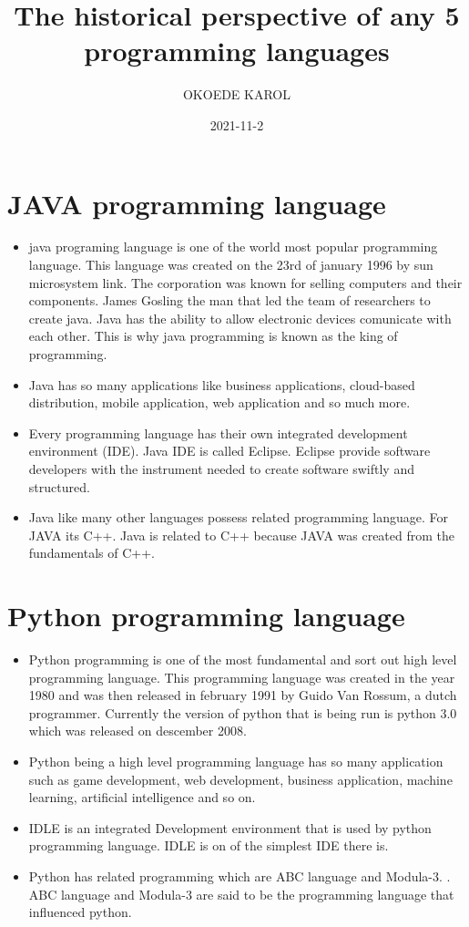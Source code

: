 \documentclass{article}
\date{2021-11-2}
\title {The historical perspective of any 5 programming languages}
\author{OKOEDE KAROL}
\begin{document}
	\maketitle
	\newpage
	\section{JAVA programming language}
	\begin{itemize}
	 \item java programing language is one of the world most popular programming language. This language was created on the 23rd of january 1996 by sun microsystem link. The corporation was known for selling computers and their components. James Gosling the man that led the team of researchers to create java. Java has the ability to allow electronic devices comunicate with each other. This is why java programming is known as the king of programming.
	 \item Java has so many applications like business applications, cloud-based distribution, mobile application, web application and so much more.
	 \item Every programming language has their own integrated development environment (IDE). Java IDE is called Eclipse. Eclipse provide software developers with the instrument needed to create software swiftly and structured.
	 \item Java like many other languages possess related programming language. For JAVA its C++. Java is related to C++ because JAVA was created from the fundamentals of C++.
	\end{itemize}
\newpage
\section{Python programming language}
\begin{itemize}
	\item Python programming is one of the most fundamental and sort out high level programming language. This programming language was created in the year 1980 and was then released in february 1991 by Guido Van Rossum, a dutch programmer. Currently the version of python that is being run is python 3.0 which was released on descember 2008.
	\item Python being a high level programming language has so many application such as game development, web development, business application, machine learning, artificial intelligence and so on.
	\item IDLE is an integrated Development environment that is used by python programming language. IDLE is on of the simplest IDE there is.
	\item Python has related programming which are ABC language and Modula-3. . ABC language and Modula-3 are said to be the programming language that influenced python. 
\end{itemize}
\newpage
\end{document}
